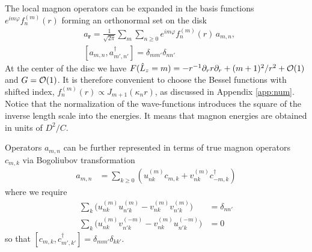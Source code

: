 \documentclass[aps,prb,twocolumn,superscriptaddress,nobalancelastpage]{revtex4-1}
\begin{document}
The local magnon operators can be expanded in  
the basis functions  $ e^{im\varphi } f_{n}^{(m)}( r )$ forming an orthonormal set on the disk
\begin{equation}
\begin{aligned}
  & a_{\mathbf{r}} = \frac{1}{\sqrt {2\pi } }
\sum_{m}  \sum\limits_{n\ge 0} e^{im\varphi } f_{n}^{(m)}( r )\, a_{m,n} , \\ 
  & \left[ a_{m,n}  ,a_{m',n'}^\dag  \right]  = \delta _{mm'}\delta _{nn'} 
\end{aligned}
\label{eq:expansionBose}
\end{equation}
 At the center of the disc  we have $F(\hat L_{z} =m) = 
- r^{-1} \partial_{r}  r  \partial_{r}  + (m+1)^{2} /r^{2}  + {\cal O}(1) $ and $G =  {\cal O}(1)$.  It is  therefore convenient to choose the Bessel functions with shifted index, $f_{n}^{(m)}( r ) \propto J_{m+1} (\kappa_{n} r)$, as discussed in Appendix  \ref{app:num}.   Notice that the normalization of the wave-functions introduces the square of the inverse length scale into the energies. It means that magnon energies are obtained in units of $D^{2}/C$.
 
Operators $a_{m,n}$  can be further represented in terms of true magnon operators $c_{m,k}$ via Bogoliubov transformation 
\begin{equation}
\begin{aligned}
  a_{m,n} &= \sum_{k\geq0} (  u^{(m)}_{nk} c_{m,k} + v^{(m)}_{nk} c^{\dagger}_{-m,k}   )
\end{aligned}
\label{eq:uvBogo}
\end{equation}
where we require 
\begin{equation}  
\begin{aligned}
\sum_k \big( u^{(m)}_{nk} u^{(m)}_{n'k} - v^{(m)}_{nk} v^{(m)}_{n'k}  \big )&= \delta _{nn'}   \\
\sum_k \big(u^{(m)}_{nk} v^{(-m)}_{n'k} - v^{(m)}_{nk}u^{(-m)}_{n'k} \big ) &= 0   
\end{aligned}
\label{eq:uvBogolubov}
\end{equation}
so that $ [c_{m,k} ,c_{m',k'} ^\dag  ] = \delta _{mm'}\delta _{kk'}$.
\end{document}
